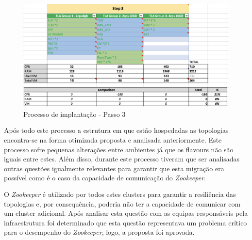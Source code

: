 \begin{figure}[H]
  \centerline{\includegraphics[scale=0.5]{media/content/analise/strat-3.png}}
  \caption{Processo de implantação - Passo 3}
  \label{strat-3}
\end{figure}

Após todo este processo a estrutura em que estão hospedadas as topologias encontra-se na forma
otimizada proposta e analisada anteriormente. Este processo sofre pequenas alterações entre
ambientes já que os \glspl{flavour} não são iguais entre estes. Além disso, durante este processo
tiveram que ser analisadas outras questões igualmente relevantes para garantir que esta migração
era possível como é o caso da capacidade de comunicação do \textit{Zookeeper}.

O \textit{Zookeeper} é utilizado por todos estes \glspl{cluster} para garantir a resiliência das 
topologias e, por consequência, poderia não ter a capacidade de comunicar com um \gls{cluster}
adicional. Após analisar esta questão com as equipas responsáveis pela infraestrutura foi 
determinado que esta questão representava um problema crítico para o desempenho do 
\textit{Zookeeper}, logo, a proposta foi aprovada.

